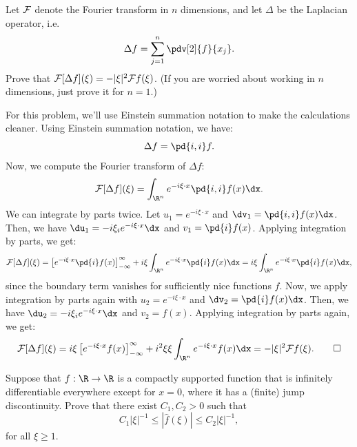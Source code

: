 \begin{problem}[13]
  Let $\mathcal{F}$ denote the Fourier transform in $n$ dimensions, and let $\Delta$ be the Laplacian operator, i.e.
  \[%
    \Delta f = \sum_{j=1}^n \pdv[2]{f}{x_j}
  .\]%
  Prove that $\mathcal{F}[\Delta f](\xi) = -|\xi|^2 \mathcal{F} f(\xi)$. (If you are worried about working in $n$ dimensions, just prove it for $n=1$.)
\end{problem}

\begin{solution}
  For this problem, we'll use Einstein summation notation to make the calculations cleaner. Using Einstein summation notation, we have:
  \[%
    \Delta f = \pd{i,i}f
  .\]%
  Now, we compute the Fourier transform of $\Delta f$:
  \[%
    \F[\Delta f](\xi) = \int_{\R^n} e^{-i \xi \cdot x} \pd{i,i}f(x) \dx
  .\]%
  We can integrate by parts twice. Let $u_1 = e^{-i \xi \cdot x}$ and $\dv_1 = \pd{i,i}f(x) \dx$. Then, we have $\du_1 = -i \xi_i e^{-i \xi \cdot x} \dx$ and $v_1 = \pd{i}f(x)$. Applying integration by parts, we get:
  \[%
    \F[\Delta f](\xi) = \left[ e^{-i \xi \cdot x} \pd{i}f(x) \right]_{-\infty}^{\infty} + i \xi \int_{\R^n} e^{-i \xi \cdot x} \pd{i}f(x) \dx = i \xi \int_{\R^n} e^{-i \xi \cdot x} \pd{i}f(x) \dx
  ,\]%
  since the boundary term vanishes for sufficiently nice functions $f$. Now, we apply integration by parts again with $u_2 = e^{-i \xi \cdot x}$ and $\dv_2 = \pd{i}f(x) \dx$. Then, we have $\du_2 = -i \xi_i e^{-i \xi \cdot x} \dx$ and $v_2 = f(x)$. Applying integration by parts again, we get:
  \[%
    \F[\Delta f](\xi) = i \xi \left[ e^{-i \xi \cdot x} f(x) \right]_{-\infty}^{\infty} + i^2 \xi \xi \int_{\R^n} e^{-i \xi \cdot x} f(x) \dx = -|\xi|^2 \F f(\xi)
  .\qedhere\]%
\end{solution}

\begin{problem}[14]
  Suppose that $f : \R \to \R$ is a compactly supported function that is infinitely differentiable everywhere except for $x = 0$, where it has a (finite) jump discontinuity. Prove that there exist $C_1, C_2 > 0$ such that
  \[%
    C_1|\xi|^{-1} \leq |\hat{f}(\xi)| \leq C_2 |\xi|^{-1}
  ,\]%
  for all $\xi \geq 1$.
\end{problem}

\begin{solution}
\end{solution}
